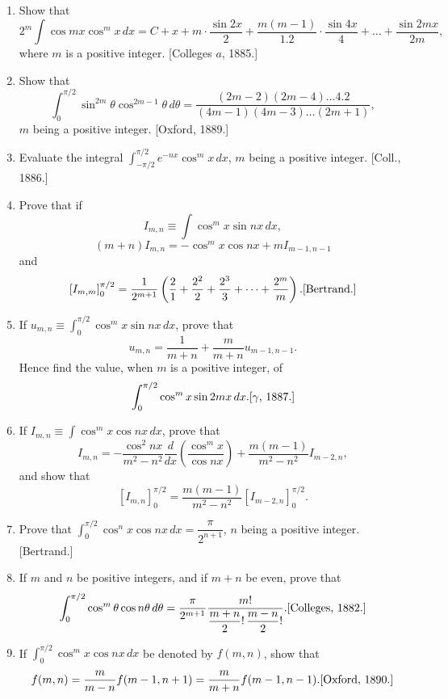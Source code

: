 \documentclass[11pt, a4paper]{article}
\newcommand{\source}[1]{\hfill\textnormal{[#1]}}
\begin{document}
\begin{enumerate}[leftmargin=2em]
\item Show that
\[
2^m\int \cos mx\cos^mx\,dx
=C+x+m\cdot\dfrac{\sin2x}{2}+\dfrac{m(m-1)}{1.2}\cdot\dfrac{\sin4x}{4}+\dots+\dfrac{\sin2mx}{2m},
\]
where $m$ is a positive integer. \source{Colleges $a$, 1885.}

\item Show that
\[
\int_0^{\pi/2}\sin^{2m}\theta\cos^{2m-1}\theta\,d\theta=\dfrac{(2m-2)(2m-4)\dots4.2}{(4m-1)(4m-3)\dots(2m+1)},
\]
$m$ being a positive integer. \source{Oxford, 1889.}

\item Evaluate the integral $\displaystyle\int_{-\pi/2}^{\pi/2}e^{-nx}\cos^mx\,dx$, $m$ being a positive integer. \source{Coll., 1886.}

\item Prove that if
\[
I_{m,n}\equiv\int \cos^mx\sin nx\,dx,
\]
\[
(m+n)I_{m,n}=-\cos^mx\cos nx+mI_{m-1,n-1}
\]
and
\[
\left[I_{m,m}\right]_0^{\pi/2}=\dfrac{1}{2^{m+1}}\left(\dfrac21+\dfrac{2^2}{2}+\dfrac{2^3}{3}+\dots+\dfrac{2^m}{m}\right). \source{Bertrand.}
\]

\item If $u_{m,n}\equiv\displaystyle\int_0^{\pi/2}\cos^mx\sin nx\,dx$, prove that
\[
u_{m,n}=\dfrac{1}{m+n}+\dfrac{m}{m+n}u_{m-1,n-1}.
\]
Hence find the value, when $m$ is a positive integer, of
\[
\int_0^{\pi/2}\cos^mx\sin2mx\,dx. \source{$\gamma$, 1887.}
\]

\item If $I_{m,n}\equiv\displaystyle\int \cos^mx\cos nx\,dx$, prove that
\[
I_{m,n}=-\dfrac{\cos^2nx}{m^2-n^2}\dfrac{d}{dx}\left(\dfrac{\cos^mx}{\cos nx}\right)+\dfrac{m(m-1)}{m^2-n^2}I_{m-2,n},
\]
and show that
\[
\left[I_{m,n}\right]_0^{\pi/2}=\dfrac{m(m-1)}{m^2-n^2}\left[I_{m-2,n}\right]_0^{\pi/2}.
\]

\item Prove that $\displaystyle\int_0^{\pi/2}\cos^nx\cos nx\,dx=\dfrac{\pi}{2^{n+1}}$, $n$ being a positive integer. \source{Bertrand.}

\item If $m$ and $n$ be positive integers, and if $m+n$ be even, prove that
\[
\int_0^{\pi/2}\cos^m\theta\cos n\theta\,d\theta=\dfrac{\pi}{2^{m+1}}\dfrac{m!}{\dfrac{m+n}{2}!\,\dfrac{m-n}{2}!}. \source{Colleges, 1882.}
\]

\item If $\displaystyle\int_0^{\pi/2}\cos^mx\cos nx\,dx$ be denoted by $f(m,n)$, show that
\[
f(m,n)=\dfrac{m}{m-n}f(m-1,n+1)=\dfrac{m}{m+n}f(m-1,n-1). \source{Oxford, 1890.}
\]


\end{enumerate}
\end{document}

